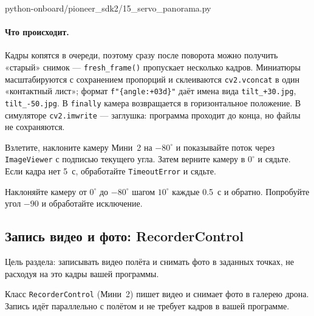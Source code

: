 \begin{codefile}[python]{python-onboard/pioneer_sdk2/15_servo_panorama.py}
\end{codefile}

\paragraph{Что происходит.} Кадры копятся в очереди, поэтому сразу после поворота можно получить «старый» снимок --- \verb|fresh_frame()| пропускает несколько кадров. Миниатюры масштабируются с сохранением пропорций и склеиваются \verb|cv2.vconcat| в один «контактный лист»; формат \verb|f"{angle:+03d}"| даёт имена вида \texttt{tilt\_+30.jpg}, \texttt{tilt\_-50.jpg}. В \verb|finally| камера возвращается в горизонтальное положение. В симуляторе \verb|cv2.imwrite| --- заглушка: программа проходит до конца, но файлы не сохраняются.

\begin{taskbox}
Взлетите, наклоните камеру Мини~2 на $-80^\circ$ и показывайте поток через \verb|ImageViewer| с подписью текущего угла. Затем верните камеру в $0^\circ$ и сядьте. Если кадра нет 5~с, обработайте \verb|TimeoutError| и сядьте.
\end{taskbox}

\begin{taskbox}
Наклоняйте камеру от $0^\circ$ до $-80^\circ$ шагом $10^\circ$ каждые 0.5~с и обратно. Попробуйте угол $-90$ и обработайте исключение.
\end{taskbox}

\subsection{Запись видео и фото: RecorderControl}

Цель раздела: записывать видео полёта и снимать фото в заданных точках, не расходуя на это кадры вашей программы.

Класс \verb|RecorderControl| (Мини~2) пишет видео и снимает фото в галерею дрона. Запись идёт параллельно с полётом и не требует кадров в вашей программе.

